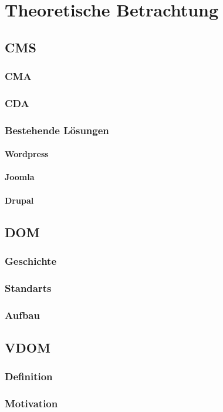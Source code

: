 \chapter{Theoretische Betrachtung}
\section{\acl{CMS}}
\subsection{\acl{CMA}}
\subsection{\acl{CDA}}
\subsection{Bestehende Lösungen}
\subsubsection{Wordpress}
\subsubsection{Joomla}
\subsubsection{Drupal}
\section{\acl{DOM}}
\subsection{Geschichte}
\subsection{Standarts}
\subsection{Aufbau}
\section{\acl{VDOM}}
\subsection{Definition}
\subsection{Motivation}

